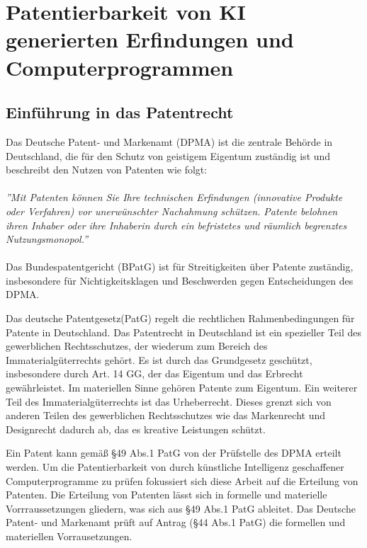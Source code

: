 \chapter{Patentierbarkeit von KI generierten Erfindungen und Computerprogrammen\label{cha:chapter3}}


\section{Einführung in das Patentrecht\label{sec:Patentrecht}}


Das Deutsche Patent- und Markenamt (DPMA) ist die zentrale Behörde in Deutschland, 
die für den Schutz von geistigem Eigentum zuständig ist und 
beschreibt den Nutzen von Patenten wie folgt:
\\
\\
\textit{''Mit Patenten können Sie Ihre technischen Erfindungen 
(innovative Produkte oder Verfahren) vor unerwünschter Nachahmung schützen. 
Patente belohnen ihren Inhaber 
oder ihre Inhaberin durch ein befristetes und räumlich begrenztes Nutzungsmonopol.''} 
\cite{DPMAPatentschutz}
\\
\\
Das Bundespatentgericht (BPatG) ist für Streitigkeiten über Patente zuständig, 
insbesondere für Nichtigkeitsklagen und Beschwerden gegen Entscheidungen des DPMA.

Das deutsche Patentgesetz(PatG) \cite{PatGNichtamtlichesInhaltsverzeichnis} 
regelt die rechtlichen Rahmenbedingungen für Patente in Deutschland.
Das Patentrecht in Deutschland ist ein spezieller Teil des gewerblichen Rechtsschutzes, 
der wiederum zum Bereich des Immaterialgüterrechts gehört. 
Es ist durch das Grundgesetz geschützt, insbesondere durch Art. 14 GG, 
der das Eigentum und das Erbrecht gewährleistet. 
Im materiellen Sinne gehören Patente zum Eigentum.
Ein weiterer Teil des Immaterialgüterrechts ist das Urheberrecht. 
Dieses grenzt sich von anderen Teilen des
gewerblichen Rechtsschutzes wie das Markenrecht und Designrecht dadurch ab, das 
es kreative Leistungen schützt\cite{GewerblicherRechtschutzUnd}. 


Ein Patent kann gemäß §49 Abs.1 PatG von der Prüfstelle des DPMA erteilt werden. 
Um die Patentierbarkeit von durch künstliche Intelligenz geschaffener Computerprogramme 
zu prüfen fokussiert sich diese Arbeit auf die Erteilung von Patenten. 
Die Erteilung von Patenten lässt sich in formelle und materielle Vorrraussetzungen 
gliedern, was sich aus §49 Abs.1 PatG ableitet. 
Das Deutsche Patent- und Markenamt prüft auf Antrag (§44 Abs.1 PatG) 
die formellen und materiellen Vorrausetzungen.

